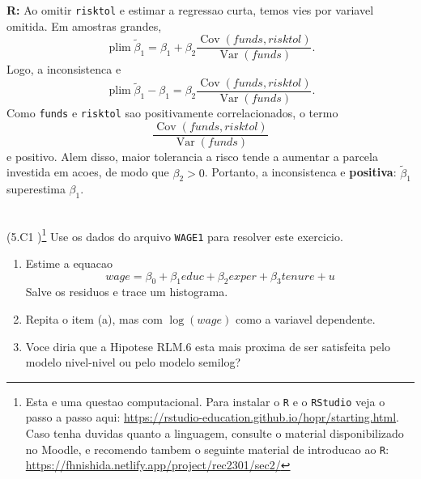 \documentclass[12pt,letterpaper, onecolumn]{exam}
\DeclareMathOperator*{\plim}{plim}
\DeclareMathOperator{\Cov}{Cov}
\DeclareMathOperator{\Var}{Var}
\renewenvironment{solution}
  {\par\noindent\textbf{R:}\enspace\color{blue}}
  {\par\color{black}}
\begin{document}
\begin{questions}
\begin{solution}
Ao omitir \texttt{risktol} e estimar a regressao curta, temos vies por variavel omitida. Em amostras grandes,
\[
\plim \tilde\beta_1
=
\beta_1 + \beta_2\frac{\Cov(funds,risktol)}{\Var(funds)}.
\]
Logo, a inconsistenca e
\[
\plim \tilde\beta_1 - \beta_1
=
\beta_2\frac{\Cov(funds,risktol)}{\Var(funds)}.
\]
Como \texttt{funds} e \texttt{risktol} sao positivamente correlacionados, o termo
\[
\frac{\Cov(funds,risktol)}{\Var(funds)}
\]
e positivo. Alem disso, maior tolerancia a risco tende a aumentar a parcela investida em acoes, de modo que \(\beta_2>0\). Portanto, a inconsistenca e \textbf{positiva}: \(\tilde\beta_1\) superestima \(\beta_1\).
\end{solution}

\
\\

\question\qstar (5.C1 \citep{wooldridge2016})\footnote{Esta e uma questao computacional. Para instalar o \texttt{R} e o \texttt{RStudio} veja o passo a passo aqui: \href{https://rstudio-education.github.io/hopr/starting.html}{https://rstudio-education.github.io/hopr/starting.html}. Caso tenha duvidas quanto a linguagem, consulte o material disponibilizado no Moodle, e recomendo tambem o seguinte material de introducao ao \texttt{R}: \href{https://fhnishida.netlify.app/project/rec2301/sec2/}{https://fhnishida.netlify.app/project/rec2301/sec2/} }
Use os dados do arquivo \texttt{WAGE1} para resolver este exercicio.

\begin{enumerate}[label = (\alph*)]
\item Estime a equacao
\[
    wage = \beta_0 + \beta_1 educ + \beta_2 exper + \beta_3 tenure + u
\]
Salve os residuos e trace um histograma.
\item Repita o item (a), mas com \(\log(wage)\) como a variavel dependente.
\item Voce diria que a Hipotese RLM.6 esta mais proxima de ser satisfeita pelo modelo nivel-nivel ou pelo modelo semilog?
\end{enumerate}

\end{questions}
\newpage


\end{document}
